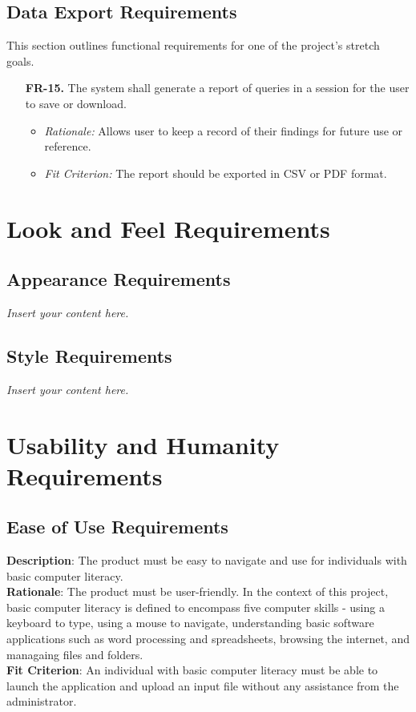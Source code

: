 \documentclass[12pt]{article}
\newcommand{\lips}{\textit{Insert your content here.}}
\begin{document}
\subsection{Data Export Requirements}
This section outlines functional requirements for one of the project's stretch goals.
\begin{enumerate}
  \item[\textbf{FR-15.}] The system shall generate a report of queries in a session for the user to save or download.
  \begin{itemize}
    \item \textit{Rationale:} Allows user to keep a record of their findings for future use or reference.
    \item \textit{Fit Criterion:} The report should be exported in CSV or PDF format.
  \end{itemize}
\end{enumerate}

\section{Look and Feel Requirements}
\subsection{Appearance Requirements}
\lips
\subsection{Style Requirements}
\lips

\section{Usability and Humanity Requirements}
\subsection{Ease of Use Requirements}
\textbf{Description}: The product must be easy to navigate and use for individuals with basic computer literacy.\\
\textbf{Rationale}: The product must be user-friendly. In the context of this project, basic computer literacy is defined to encompass five computer skills - using a keyboard
to type, using a mouse to navigate, understanding basic software applications such as word processing and spreadsheets, browsing the internet, and managaing files and folders.\\ 
\textbf{Fit Criterion}: An individual with basic computer literacy must be able to launch the application and upload an input file without any assistance from the administrator.
\end{document}
